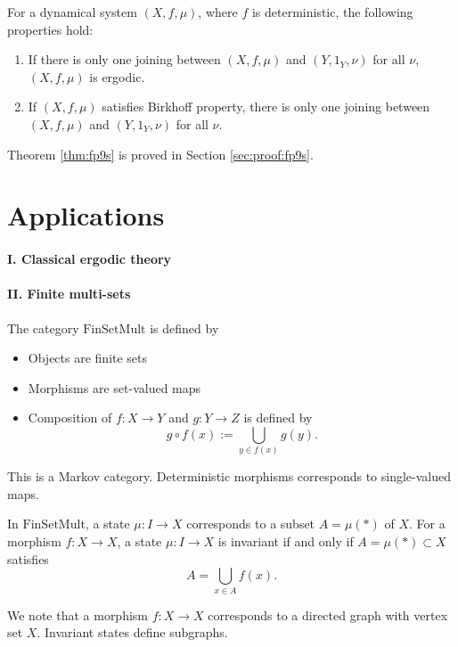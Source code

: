 \documentclass[12pt,oneside,pb-diagram]{article}
\begin{document}
\begin{theorem} \label{thm:fp9s}
	For a dynamical system $(X, f, \mu)$, where $f$ is deterministic, the following properties hold:
	\begin{enumerate}
		\item If there is only one joining between $(X,f,\mu)$ and $(Y, 1_Y, \nu)$ for all $\nu$, $(X,f,\mu)$ is ergodic.
		\item If $(X, f, \mu)$ satisfies Birkhoff property, there is only one joining between $(X,f,\mu)$ and $(Y, 1_Y, \nu)$ for all $\nu$.
	\end{enumerate}
\end{theorem}

Theorem \ref{thm:fp9s} is proved in Section \ref{sec:proof:fp9s}.
\section{Applications} \label{sec:applic}

\paragraph{I. Classical ergodic theory}

\paragraph{II. Finite multi-sets} 

\begin{definition} 
	\cite{FritzKlinger2023d} The category $\mathrm{FinSetMult} $ is defined by
	\begin{itemize}
		\item Objects are finite sets
		\item Morphisms are set-valued maps
		\item Composition of $f: X \to Y$ and $g:Y \to Z$ is defined by
		\[
		g\circ f (x) := \bigcup_{y \in f(x)} g(y). 
		\]
	\end{itemize}
\end{definition}

This is a Markov category. Deterministic morphisms corresponds to single-valued maps.
\begin{lemma}
	In $\mathrm{FinSetMult}$, a state $\mu: I \to X$ corresponds to a subset $A = \mu(*)$ of $X$. For a morphism $f:X \to X$, a state $\mu: I \to X$ is invariant if and only if $A = \mu(*) \subset X$ satisfies
	\[
	A = \bigcup_{x \in A} f(x).
	\]
\end{lemma}
We note that a morphism $f:X \to X$ corresponds to a directed graph with vertex set $X$. Invariant states define subgraphs.
\end{document}
